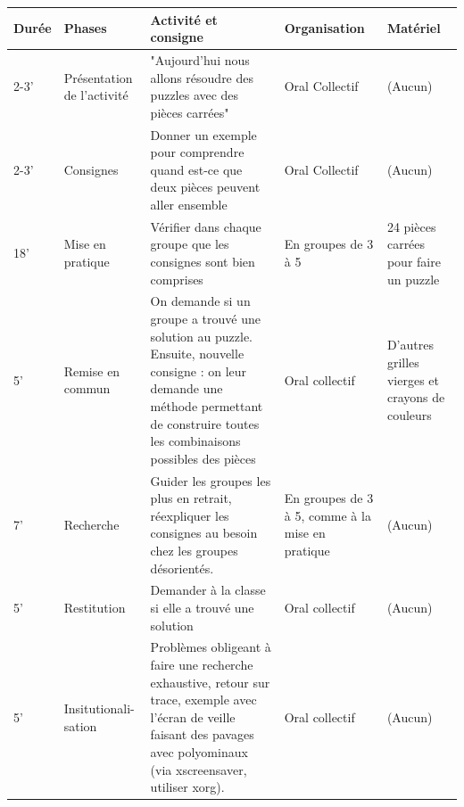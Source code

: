 \documentclass[a4paper,11pt]{article}%
\begin{document}
\begin{center}
\begin{tabular}{|l|p{5.5em}|p{15em}|p{6em}|p{6em}|}
  \hline
    \textbf{Durée} 
  & \textbf{Phases} 
  & \textbf{Activité et consigne} 
  & \textbf{Organisation} 
  & \textbf{Matériel} 
  \\
  \hline
  \hline
  2-3' 
  & Présentation de l'activité 
  & "Aujourd'hui nous allons résoudre des puzzles avec des pièces carrées"\newline
  & Oral Collectif 
  & (Aucun)
  \\
  \hline
  2-3'
  & Consignes 
  & Donner un exemple pour comprendre quand est-ce que deux pièces peuvent aller ensemble
  & Oral Collectif 
  & (Aucun)
  \\
  \hline
  18'
  & Mise en pratique
  & Vérifier dans chaque groupe que les consignes sont bien comprises 
  & En groupes de 3 à 5
  & 24 pièces carrées pour faire un puzzle
  \\
  \hline
  5'
  & Remise en commun
  & On demande si un groupe a trouvé une solution au puzzle. Ensuite, nouvelle consigne : on leur demande une méthode permettant de construire toutes les combinaisons possibles des pièces
  & Oral collectif
  & D'autres grilles vierges et crayons de couleurs
  \\
  \hline
  7'
  & Recherche
  & Guider les groupes les plus en retrait, réexpliquer les consignes au besoin chez les groupes désorientés.
  & En groupes de 3 à 5, comme à la mise en pratique
  & (Aucun)
  \\
  \hline
  5'
  & Restitution
  & Demander à la classe si elle a trouvé une solution
  & Oral collectif
  & (Aucun)
  \\
  \hline
  5'
  & Insitutionali-sation
  & Problèmes obligeant à faire une recherche exhaustive, retour sur trace, exemple avec l'écran de veille faisant des pavages avec polyominaux (via xscreensaver, utiliser xorg).
  & Oral collectif
  & (Aucun)
  \\
  \hline
\end{tabular}
\end{center}
\end{document}
